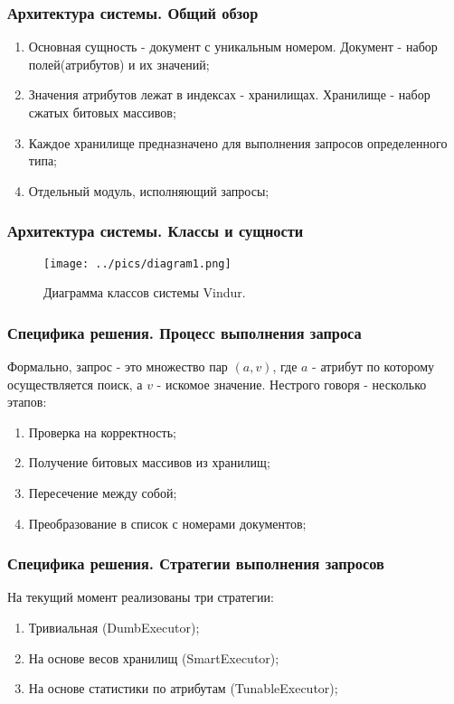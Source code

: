 \documentclass{beamer}
\begin{document}

\begin{frame}\frametitle{Архитектура системы. Общий обзор}
    \begin{enumerate}
        \item Основная сущность - документ с уникальным номером. Документ - набор полей(атрибутов) и их значений;
        \item Значения атрибутов лежат в индексах - хранилищах. Хранилище - набор сжатых битовых массивов;
        \item Каждое хранилище предназначено для выполнения запросов определенного типа;
        \item Отдельный модуль, исполняющий запросы;
    \end{enumerate}
\end{frame}

\begin{frame}\frametitle{Архитектура системы. Классы и сущности}
    \begin{figure}[H]
        \centering
        \texttt{[image: ../pics/diagram1.png]}
        \caption{Диаграмма классов системы Vindur.}
        \label{classes}
        \end{figure}
\end{frame}

\begin{frame}\frametitle{Специфика решения. Процесс выполнения запроса}
    Формально, запрос - это множество пар $(a, v)$, где $a$ - атрибут по которому осуществляется поиск, а $v$ - искомое значение.
    Нестрого говоря - несколько этапов:
    \begin{enumerate}
        \item Проверка на корректность;
        \item Получение битовых массивов из хранилищ;
        \item Пересечение между собой;
        \item Преобразование в список с номерами документов;
    \end{enumerate}
\end{frame}

\begin{frame}\frametitle{Специфика решения. Стратегии выполнения запросов}
    На текущий момент реализованы три стратегии:
    \begin{enumerate}
        \item Тривиальная (DumbExecutor);
        \item На основе весов хранилищ (SmartExecutor);
        \item На основе статистики по атрибутам (TunableExecutor);
    \end{enumerate}
\end{frame}
\end{document}
